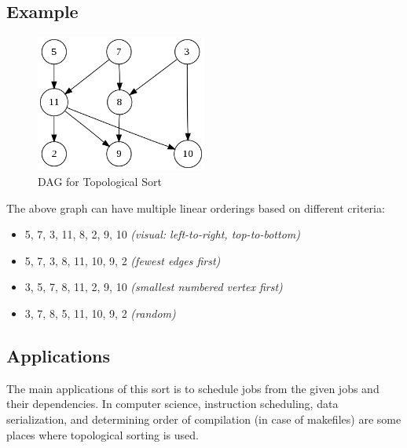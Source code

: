 \documentclass{article}
\begin{document}
\subsection{Example}
\begin{center}
    \begin{figure}[H]
        \centering
        \includegraphics[width=0.5\textwidth]{dag.png}
        \caption{DAG for Topological Sort}
        \label{fig:dag}
    \end{figure}
\end{center}
The above graph can have multiple linear orderings based on different criteria:
\begin{itemize}
    \item \textsc{5, 7, 3, 11, 8, 2, 9, 10} 
    \textit{(visual: left-to-right, top-to-bottom)}
    \item \textsc{5, 7, 3, 8, 11, 10, 9, 2} 
    \textit{(fewest edges first)}
    \item \textsc{3, 5, 7, 8, 11, 2, 9, 10} 
    \textit{(smallest numbered vertex first)}
    \item \textsc{3, 7, 8, 5, 11, 10, 9, 2}
    \textit{(random)}
\end{itemize}
\subsection{Applications}
The main applications of this sort is to schedule jobs from the given jobs and their dependencies. In computer science, instruction scheduling, data serialization, and determining order of compilation (in case of makefiles) are some places where topological sorting is used.

\newpage
\end{document}
